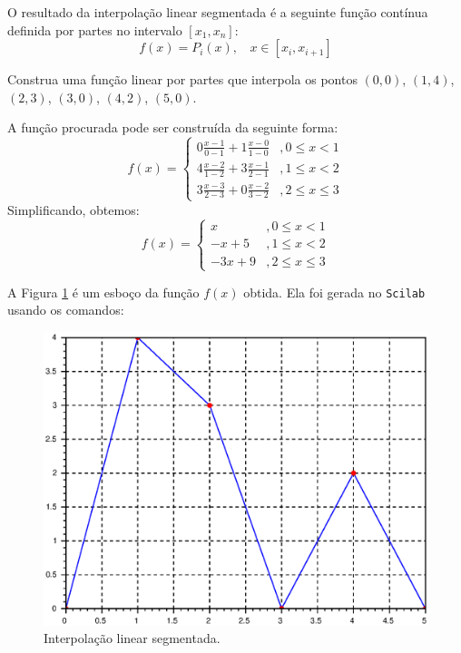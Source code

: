 O resultado da interpolação linear segmentada é a seguinte função contínua definida por partes no intervalo $[x_1,x_n]$:
$$f(x)=P_i(x), ~~~~ x\in [x_i,x_{i+1}]$$

\begin{ex}
  Construa uma função linear por partes que interpola os pontos $(0,0)$, $(1,4)$, $(2,3)$, $(3,0)$, $(4,2)$, $(5,0)$.

A função procurada pode ser construída da seguinte forma:
\begin{equation*}
  f(x) = \left\{
    \begin{array}{ll}
      0\frac{x-1}{0-1} + 1\frac{x-0}{1-0} &, 0 \leq x < 1\\
      4\frac{x-2}{1-2} + 3\frac{x-1}{2-1} &, 1\leq x < 2\\
      3\frac{x-3}{2-3} + 0\frac{x-2}{3-2} &, 2\leq x \leq 3
    \end{array}
\right.
\end{equation*}
Simplificando, obtemos:
\begin{equation*}
  f(x) = \left\{
    \begin{array}{ll}
      x &, 0 \leq x < 1\\
      -x + 5 &, 1\leq x < 2\\
      -3x + 9 &, 2\leq x \leq 3
    \end{array}
\right.  
\end{equation*}
\end{ex}

A Figura \ref{fig:linear_segmentada} é um esboço da função $f(x)$ obtida. 
\ifisscilab
Ela foi gerada no \verb+Scilab+ usando os comandos:

\fi

\begin{figure}[htp]
  \begin{center}
    \includegraphics[scale=0.5]{./cap_interp/pics/interpolacao_linear_segmentada.eps}
    \caption{Interpolação linear segmentada.}
    \label{fig:linear_segmentada}
  \end{center}
\end{figure}


